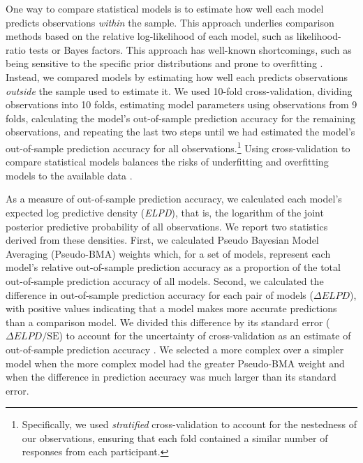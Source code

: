 \documentclass[12pt, a4paper]{article}
\begin{document}
One way to compare statistical models is to estimate how well each model predicts observations \emph{within} the sample. This approach underlies comparison methods based on the relative log-likelihood of each model, such as likelihood-ratio tests or Bayes factors. This approach has well-known shortcomings, such as being sensitive to the specific prior distributions \parencite{gelman_bayesian_2014} and prone to overfitting \parencite{yarkoni_choosing_2017}. Instead, we compared models by estimating how well each predicts observations \emph{outside} the sample used to estimate it. We used 10-fold cross-validation, dividing observations into 10 folds, estimating model parameters using observations from 9 folds, calculating the model’s out-of-sample prediction accuracy for the remaining observations, and repeating the last two steps until we had estimated the model’s out-of-sample prediction accuracy for all observations.\footnote{Specifically, we used \emph{stratified} cross-validation to account for the nestedness of our observations, ensuring that each fold contained a similar number of responses from each participant.} Using cross-validation to compare statistical models balances the risks of underfitting and overfitting models to the available data \parencite{yarkoni_choosing_2017}.

As a measure of out-of-sample prediction accuracy, we calculated each model’s expected log predictive density (\textit{ELPD}), that is, the logarithm of the joint posterior predictive probability of all observations. We report two statistics derived from these densities. First, we calculated Pseudo Bayesian Model Averaging (Pseudo-BMA) weights \parencite[using the Bayesian bootstrap method;][]{yao_using_2018} which, for a set of models, represent each model’s relative out-of-sample prediction accuracy as a proportion of the total out-of-sample prediction accuracy of all models. Second, we calculated the difference in out-of-sample prediction accuracy for each pair of models ($\Delta\textit{ELPD}$), with positive values indicating that a model makes more accurate predictions than a comparison model. We divided this difference by its standard error ($\Delta\textit{ELPD}/\text{SE}$) to account for the uncertainty of cross-validation as an estimate of out-of-sample prediction accuracy \parencite{vehtari_practical_2017}. We selected a more complex over a simpler model when the more complex model had the greater Pseudo-BMA weight and when the difference in prediction accuracy was much larger than its standard error.  
\end{document}
